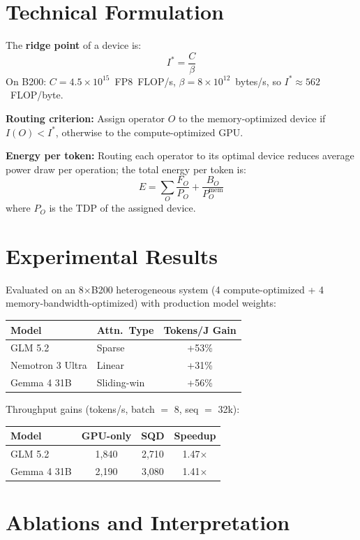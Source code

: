 \documentclass[10pt,twocolumn]{article}
\begin{document}
\section{Technical Formulation}

The \textbf{ridge point} of a device is:
\[
  I^* = \frac{C}{\beta}
\]
On B200: $C = 4.5\times 10^{15}$~FP8~FLOP/s,
$\beta = 8\times 10^{12}$~bytes/s, so $I^* \approx 562$~FLOP/byte.

\textbf{Routing criterion:} Assign operator $O$ to the memory-optimized
device if $I(O) < I^*$, otherwise to the compute-optimized GPU.

\textbf{Energy per token:} Routing each operator to its optimal device
reduces average power draw per operation; the total energy per token is:
\[
  E = \sum_O \frac{F_O}{P_O} + \frac{B_O}{P_O^{\mathrm{mem}}}
\]
where $P_O$ is the TDP of the assigned device.

\section{Experimental Results}

Evaluated on an 8$\times$B200 heterogeneous system (4 compute-optimized
+ 4 memory-bandwidth-optimized) with production model weights:

\begin{center}
\begin{tabular}{llc}
\toprule
Model & Attn.\ Type & Tokens/J Gain \\
\midrule
GLM 5.2         & Sparse      & +53\% \\
Nemotron 3 Ultra & Linear     & +31\% \\
Gemma 4 31B     & Sliding-win & +56\% \\
\bottomrule
\end{tabular}
\end{center}

Throughput gains (tokens/s, batch $=$ 8, seq $=$ 32k):

\begin{center}
\begin{tabular}{lccc}
\toprule
Model & GPU-only & SQD & Speedup \\
\midrule
GLM 5.2     & 1,840 & 2,710 & 1.47$\times$ \\
Gemma 4 31B & 2,190 & 3,080 & 1.41$\times$ \\
\bottomrule
\end{tabular}
\end{center}

\section{Ablations and Interpretation}
\end{document}
